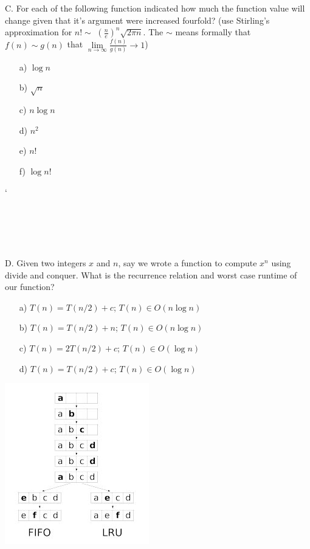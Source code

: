 \documentclass[12pt]{article}
\begin{document}
\newpage
\noindent C. For each of the following function indicated how much the function value will change given that it's argument were increased fourfold? (use Stirling's approximation for $n! \sim$ $(\frac{n}{e})^n\sqrt{2\pi n}$. The $\sim$ means formally that $f(n) \sim g(n)$ that $\lim\limits_{n\to\infty}{\frac{f(n)}{g(n)}\to1}$)
\begin{enumerate}
    \item[a)]$\log{n}$
    \item[b)]$\sqrt{n}$
    \item[c)]$n\log{n}$
    \item[d)]$n^2$
    \item[e)]$n!$
    \item[f)]$\log{n!}$
\end{enumerate}
`\\\\\\\\\\\\D. Given two integers $x$ and $n$, say we wrote a function to compute $x^n$ using divide and conquer. What is the recurrence relation and worst case runtime of our function?
\begin{enumerate}
    \item[a)]$T(n) = T(n/2) + c$; $T(n) \in O(n\log{n})$
    \item[b)]$T(n) = T(n/2) + n$; $T(n) \in O(n\log{n})$
    \item[c)] $T(n) = 2T(n/2) + c$; $T(n) \in O(\log{n})$
    \item[d)]$T(n) = T(n/2) + c$; $T(n) \in O(\log{n})$
\end{enumerate}
\newpage
\noindent \includegraphics{fifolru.jpg}\\
\end{document}
